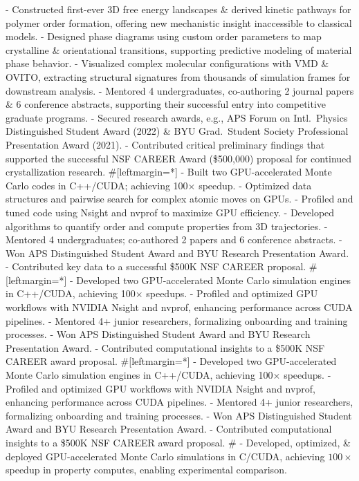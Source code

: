 - Constructed first-ever 3D free energy landscapes \& derived kinetic pathways for polymer order formation, offering new mechanistic insight inaccessible to classical models.
- Designed phase diagrams using custom order parameters to map crystalline \& orientational transitions, supporting predictive modeling of material phase behavior.%
- Visualized complex molecular configurations with VMD \& OVITO, extracting structural signatures from thousands of simulation frames for downstream analysis.
- Mentored 4 undergraduates, co-authoring 2 journal papers \& 6 conference abstracts, supporting their successful entry into competitive graduate programs.
- Secured research awards, e.g., APS Forum on Intl.~Physics Distinguished Student Award (2022) \& BYU Grad.~Student Society Professional Presentation Award (2021).
- Contributed critical preliminary findings that supported the successful NSF CAREER Award (\$500,000) proposal for continued crystallization research.
#[leftmargin=*]
- Built two GPU-accelerated Monte Carlo codes in C++/CUDA; achieving 100$\times$ speedup.
- Optimized data structures and pairwise search for complex atomic moves on GPUs.
- Profiled and tuned code using Nsight and nvprof to maximize GPU efficiency.
- Developed algorithms to quantify order and compute properties from 3D trajectories.
- Mentored 4 undergraduates; co-authored 2 papers and 6 conference abstracts.%
- Won APS Distinguished Student Award and BYU Research Presentation Award.
- Contributed key data to a successful \$500K NSF CAREER proposal.
#[leftmargin=*]
- Developed two GPU-accelerated Monte Carlo simulation engines in C++/CUDA, achieving 100$\times$ speedups.
- Profiled and optimized GPU workflows with NVIDIA Nsight and nvprof, enhancing performance across CUDA pipelines.
- Mentored 4+ junior researchers, formalizing onboarding and training processes.
- Won APS Distinguished Student Award and BYU Research Presentation Award.
- Contributed computational insights to a \$500K NSF CAREER award proposal.
#[leftmargin=*]
- Developed two GPU-accelerated Monte Carlo simulation engines in C++/CUDA, achieving 100$\times$ speedups.
- Profiled and optimized GPU workflows with NVIDIA Nsight and nvprof, enhancing performance across CUDA pipelines.
- Mentored 4+ junior researchers, formalizing onboarding and training processes.
- Won APS Distinguished Student Award and BYU Research Presentation Award.
- Contributed computational insights to a \$500K NSF CAREER award proposal.
#
- Developed, optimized, \& deployed GPU-accelerated Monte Carlo simulations in C/CUDA, achieving $100\times$ speedup in property computes, enabling experimental comparison.
